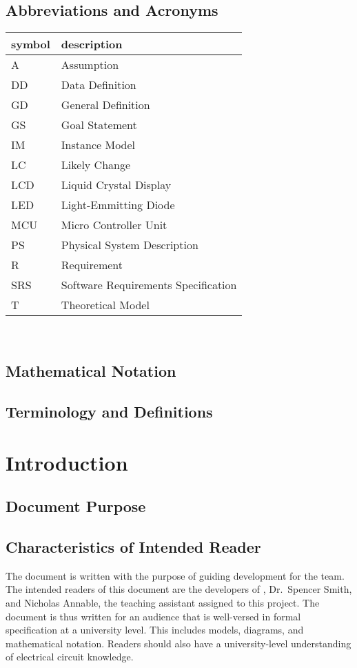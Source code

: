 \documentclass[12pt]{article}
\begin{document}
\newpage

\subsection{Abbreviations and Acronyms}
\begin{tabular}{l l} 
  \toprule		
  \textbf{symbol} & \textbf{description}\\
  \midrule 
  A & Assumption\\
  DD & Data Definition\\
  GD & General Definition\\
  GS & Goal Statement\\
  IM & Instance Model\\
  LC & Likely Change\\
  LCD & Liquid Crystal Display\\
  LED & Light-Emmitting Diode\\
  MCU & Micro Controller Unit\\
  PS & Physical System Description\\
  R & Requirement\\
  SRS & Software Requirements Specification\\
  T & Theoretical Model\\
  \bottomrule
\end{tabular}\\

\subsection{Mathematical Notation}

\subsection{Terminology and  Definitions}

\section{Introduction}
\subsection{Document Purpose}
\subsection{Characteristics of Intended Reader}
{The document is written with the purpose of guiding development for the \progname{} team. The intended readers of this document 
are the developers of \progname{}, Dr.~Spencer Smith, and Nicholas Annable, the teaching assistant assigned to this project. The 
document is thus written for an audience that is well-versed in formal specification at a university level. This includes models, 
diagrams, and mathematical notation. Readers should also have a university-level understanding of electrical circuit knowledge.}
\end{document}
